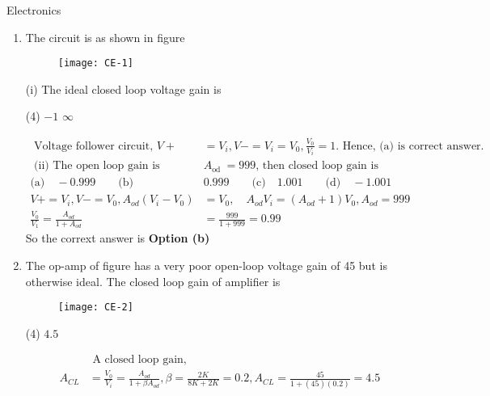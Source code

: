 \begin{abox}
	Electronics
	\end{abox}
\begin{enumerate}
	\item The circuit is as shown in figure
	\begin{figure}[H]
		\centering
		\texttt{[image: CE-1]}
	\end{figure}
	(i) The ideal closed loop voltage gain is
	 \begin{tasks}(4)
		\task[\textbf{b.}]$-1$
		\task[\textbf{c.}]$\infty$
	\end{tasks}
	\begin{answer}
		$$
		\begin{aligned}
		\text { Voltage follower circuit, } V+&=V_{i}, V-=V_{i}=V_{0}, \frac{V_{0}}{V_{i}}=1 \text {. Hence, (a) is correct answer. }\\
		\text { (ii) The open loop gain is } &A_{\text {od }}=999 \text {, then closed loop gain is }\\
		\text{(a)}\quad -0.999\qquad
		\text{(b)}\quad &0.999 \qquad
		\text{(c)}\quad 1.001 \qquad
		\text{(d)}\quad -1.001\\
		V+=V_{i}, V-=V_{0}, A_{o d}\left(V_{i}-V_{0}\right)&=V_{0}, \quad A_{o d} V_{i}=\left(A_{o d}+1\right) V_{0}, A_{o d}=999\\
		\frac{V_{0}}{V_{1}}=\frac{A_{o d}}{1+A_{o d}}&=\frac{999}{1+999}=0.99
	\end{aligned}
	$$
	So the corrext answer is \textbf{Option (b)}
	\end{answer}
	\item The op-amp of figure has a very poor open-loop voltage gain of 45 but is otherwise ideal. The closed loop gain of amplifier is
	\begin{figure}[H]
		\centering
		\texttt{[image: CE-2]}
	\end{figure}
	 \begin{tasks}(4)
		\task[\textbf{b.}]$4.5$
	\end{tasks}
	\begin{answer}
		$$
		\begin{aligned}
		&\text { A closed loop gain, }\\
		A_{C L}&=\frac{V_{0}}{V_{i}}=\frac{A_{o d}}{1+\beta A_{o d}}, \beta=\frac{2 K}{8 K+2 K}=0.2, A_{C L}=\frac{45}{1+(45)(0.2)}=4.5
	\end{aligned}
$$
\end{answer}
\end{enumerate}
